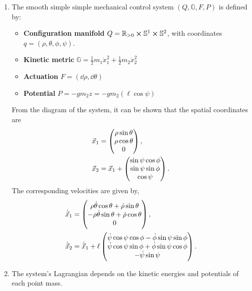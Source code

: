 \documentclass[main.tex]{subfiles}
\begin{document}
\begin{enumerate}[(1)]
\item The smooth simple simple mechanical control system $(Q,\mathbb{G},F,P)$ is defined by:
\begin{itemize}
    \item \textbf{Configuration manifold} $Q=\mathbb{R}_{>0}\cross\mathbb{S}^1\cross\mathbb{S}^2$, with coordinates $q=(\rho,\theta,\phi,\psi)$.
    \item \textbf{Kinetic metric} $\mathbb{G}=\frac{1}{2}m_1\dot{x}_1^2+\frac{1}{2}m_2\dot{x}_2^2$
    \item \textbf{Actuation} $F=(\dd \rho,\dd \theta)$
    \item \textbf{Potential} $P=-gm_2z=-gm_2(\ell\cos \psi)$
\end{itemize}
From the diagram of the system, it can be shown that the spatial coordinates are
\begin{align}
    \Vec{x}_1&=\pmqty{\rho\sin\theta\\\rho\cos\theta\\0}
    ,\\
    \Vec{x}_2&=\Vec{x}_1+\pmqty{\sin\psi\cos\phi\\\sin\psi\sin\phi\\\cos\psi}
    .
\end{align}
The corresponding velocities are given by,
\begin{align}
    \dot{\Vec{x}}_1&=\pmqty{\rho\dot\theta\cos\theta+\dot\rho\sin\theta\\-\rho\dot{\theta}\sin\theta+\dot\rho\cos\theta\\0}
    ,\\
    \dot{\Vec{x}}_2&=\dot{\Vec{x}}_1+\ell\pmqty{\dot\psi\cos\psi\cos\phi-\dot\phi\sin\psi\sin\phi\\\dot\psi\cos\psi\sin\phi+\dot\phi\sin\psi\cos\phi\\-\dot\psi\sin\psi}. 
\end{align}
\item The system's Lagrangian depends on the kinetic energies and potentials of each point mass. 


\end{enumerate}
\end{document}
